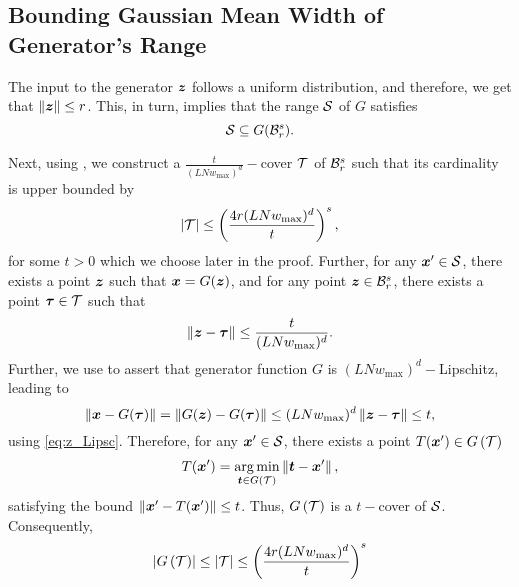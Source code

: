 \documentclass[journal]{IEEEtran}
\begin{document}
\subsection{Bounding Gaussian Mean Width of Generator's Range}
The input to the generator $\boldsymbol{z}$ follows a uniform distribution, and therefore, we get that $\left\Vert\boldsymbol{z}\right\Vert\leq r$. This, in turn, implies that the range $\mathcal{S}$ of $G$ satisfies 
\begin{equation}
\mathcal{S}\subseteq G(\mathcal{B}^s_r).\label{eq:subset}
\end{equation}

Next, using , we construct a $\frac{t}{(LNw_{\max})^d}-$cover $\mathcal{T}$ of $\mathcal{B}^s_r$ such that its cardinality is upper bounded by 
\begin{equation}
    \left\vert\mathcal{T}\right\vert\leq\left(\frac{4r(LNw_{\max})^d}{t}\right)^{s},
\end{equation}
for some $t>0$ which we choose later in the proof. Further, for any $\boldsymbol{x}'\in\mathcal{S}$, there exists a point $\boldsymbol{z}$ such that $\boldsymbol{x}=G(\boldsymbol{z})$, and for any point $\boldsymbol{z}\in \mathcal{B}^s_r$, there exists a point $\boldsymbol{\tau}\in\mathcal{T}$ such that
\begin{equation}\label{eq:z_Lipsc}
    \left\Vert\boldsymbol{z}-\boldsymbol{\tau}\right\Vert\leq \frac{t}{(LNw_{\max})^d}.
\end{equation}
Further,  we use  to assert that generator function $G$ is $(L Nw_{\max})^d-$Lipschitz, leading to
\begin{equation}
    \left\Vert\boldsymbol{x}-G(\boldsymbol{\tau})\right\Vert=\left\Vert G(\boldsymbol{z})-G(\boldsymbol{\tau})\right\Vert \leq (L Nw_{\max})^d\left\Vert\boldsymbol{z}-\boldsymbol{\tau}\right\Vert \leq t,
\end{equation}
using \eqref{eq:z_Lipsc}. Therefore, for any $\boldsymbol{x}'\in\mathcal{S}$, there exists a point $T(\boldsymbol{x}')\in G\left(\mathcal{T}\right)$
\begin{equation}
    T(\boldsymbol{x}')=\underset{\boldsymbol{t}\in G\left(\mathcal{T}\right)}{\arg\min}\left\Vert\boldsymbol{t}-\boldsymbol{x}'\right\Vert,
\end{equation}
satisfying the bound $\left\Vert \boldsymbol{x}'-T(\boldsymbol{x}')\right\Vert\leq t$.
Thus, $G\left(\mathcal{T}\right)$ is a  $t-$cover of $\mathcal{S}$. Consequently,
\begin{equation}\label{eq:T_cardinality}
\left\vert G\left(\mathcal{T}\right)\right\vert\leq \left\vert\mathcal{T}\right\vert\leq \left(\frac{4r(L Nw_{\max})^d}{t}\right)^{s}
\end{equation}
\end{document}
